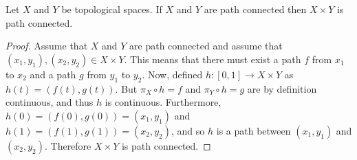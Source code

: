 \documentclass[letterpaper,12pt,fleqn]{article}
\begin{document}
\begin{theorem}
  Let \(X\) and \(Y\) be topological spaces.  If \(X\) and \(Y\) are path connected then \(X\times Y\) is path
  connected.
\end{theorem}

\begin{proof}
  Assume that \(X\) and \(Y\) are path connected and assume that \((x_1,y_1),(x_2,y_2)\in X\times Y\).  This means
  that there must exist a path \(f\) from \(x_1\) to \(x_2\) and a path \(g\) from \(y_1\) to \(y_2\).  Now,
  defined \(h:[0,1]\to X\times Y\) as \(h(t)=(f(t),g(t))\).  But \(\pi_X\circ h=f\) and \(\pi_Y\circ h=g\) are
  by definition continuous, and thus \(h\) is continuous.  Furthermore, \(h(0)=(f(0),g(0))=(x_1,y_1)\) and
  \(h(1)=(f(1),g(1))=(x_2,y_2)\), and so \(h\) is a path between \((x_1,y_1)\) and \((x_2,y_2)\).  Therefore
  \(X\times Y\) is path connected.
\end{proof}
\end{document}
